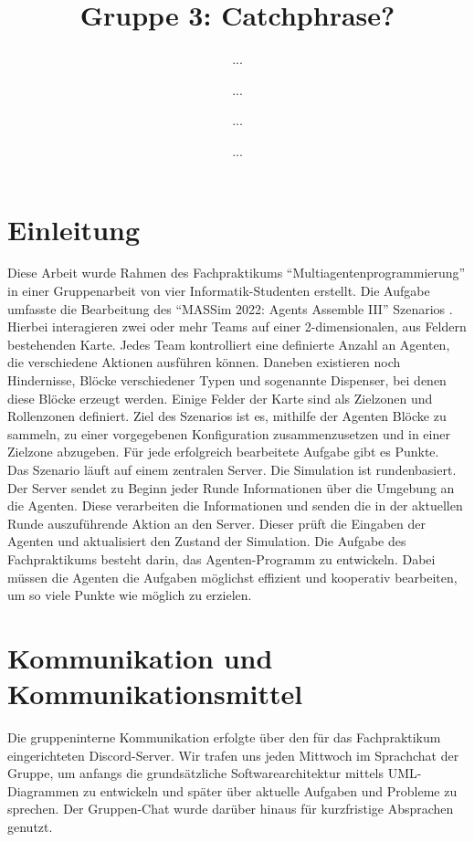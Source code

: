 \documentclass[runningheads]{llncs}
\begin{document}
%
\title{Gruppe 3: Catchphrase?}
%
%
\author{...\and
...\and
...\and
...}
%
%
%
\maketitle              %
%
%
\section{Einleitung}
Diese Arbeit wurde Rahmen des Fachpraktikums "`Multiagentenprogrammierung"' in einer Gruppenarbeit von vier Informatik-Studenten erstellt. Die Aufgabe umfasste die Bearbeitung des "`MASSim 2022: Agents Assemble III"' Szenarios \cite{EISMASSim}. Hierbei interagieren zwei oder mehr Teams auf einer 2-dimensionalen, aus Feldern bestehenden Karte. Jedes Team kontrolliert eine definierte Anzahl an Agenten, die verschiedene Aktionen ausführen können. Daneben existieren noch Hindernisse, Blöcke verschiedener Typen und sogenannte Dispenser, bei denen diese Blöcke erzeugt werden. Einige Felder der Karte sind als Zielzonen und Rollenzonen definiert. Ziel des Szenarios ist es, mithilfe der Agenten Blöcke zu sammeln, zu einer vorgegebenen Konfiguration zusammenzusetzen und in einer Zielzone abzugeben. Für jede erfolgreich bearbeitete Aufgabe gibt es Punkte. \\

Das Szenario läuft auf einem zentralen Server. Die Simulation ist rundenbasiert. Der Server sendet zu Beginn jeder Runde Informationen über die Umgebung an die Agenten. Diese verarbeiten die Informationen und senden die in der aktuellen Runde auszuführende Aktion an den Server. Dieser prüft die Eingaben der Agenten und aktualisiert den Zustand der Simulation. Die Aufgabe des Fachpraktikums besteht darin, das Agenten-Programm zu entwickeln. Dabei müssen die Agenten die Aufgaben möglichst effizient und kooperativ bearbeiten, um so viele Punkte wie möglich zu erzielen.

\section{Kommunikation und Kommunikationsmittel}
Die gruppeninterne Kommunikation erfolgte über den für das Fachpraktikum eingerichteten Discord-Server. Wir trafen uns jeden Mittwoch im Sprachchat der Gruppe, um anfangs die grundsätzliche Softwarearchitektur mittels UML-Diagrammen zu entwickeln und später über aktuelle Aufgaben und Probleme zu sprechen. Der Gruppen-Chat wurde darüber hinaus für kurzfristige Absprachen genutzt.\\
\end{document}
